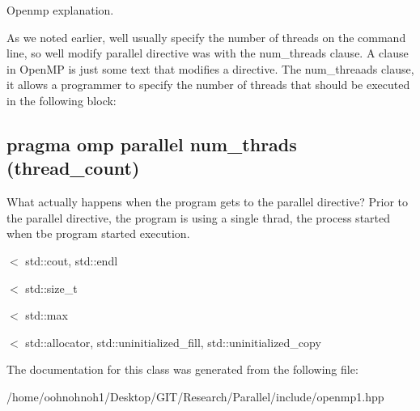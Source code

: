 Openmp explanation. 

As we noted earlier, we\textquotesingle{}ll usually specify the number of threads on the command line, so we\textquotesingle{}ll modify parallel directive was with the num\+\_\+threads clause. A clause in Open\+MP is just some text that modifies a directive. The num\+\_\+threaads clause, it allows a programmer to specify the number of threads that should be executed in the following block\+:

\subsection*{pragma omp parallel num\+\_\+thrads (thread\+\_\+count)}

What actually happens when the program gets to the parallel directive? Prior to the parallel directive, the program is using a single thrad, the process started when tbe program started execution.

$<$ std\+::cout, std\+::endl

$<$ std\+::size\+\_\+t

$<$ std\+::max

$<$ std\+::allocator, std\+::uninitialized\+\_\+fill, std\+::uninitialized\+\_\+copy 

The documentation for this class was generated from the following file\+:\begin{DoxyCompactItemize}
\item 
/home/oohnohnoh1/\+Desktop/\+G\+I\+T/\+Research/\+Parallel/include/openmp1.\+hpp\end{DoxyCompactItemize}
